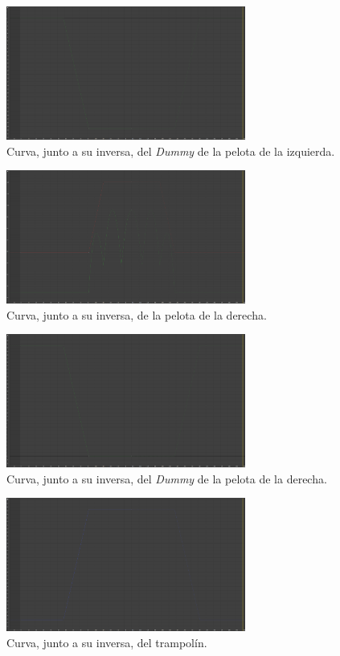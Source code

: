 \begin{figure}[H]
   \centering
   \includegraphics[width=0.7\textwidth]{imagenes/curvas finales/DPL.png}
   \caption{Curva, junto a su inversa, del \textit{Dummy} de la pelota de la izquierda.}
\end{figure}

\begin{figure}[H]
   \centering
   \includegraphics[width=0.7\textwidth]{imagenes/curvas finales/PR.png}
   \caption{Curva, junto a su inversa, de la pelota de la derecha.}
\end{figure}

\begin{figure}[H]
   \centering
   \includegraphics[width=0.7\textwidth]{imagenes/curvas finales/DPR.png}
   \caption{Curva, junto a su inversa, del \textit{Dummy} de la pelota de la derecha.}
\end{figure}

\begin{figure}[H]
   \centering
   \includegraphics[width=0.7\textwidth]{imagenes/curvas finales/trampolin.png}
   \caption{Curva, junto a su inversa, del trampolín.}
\end{figure}

